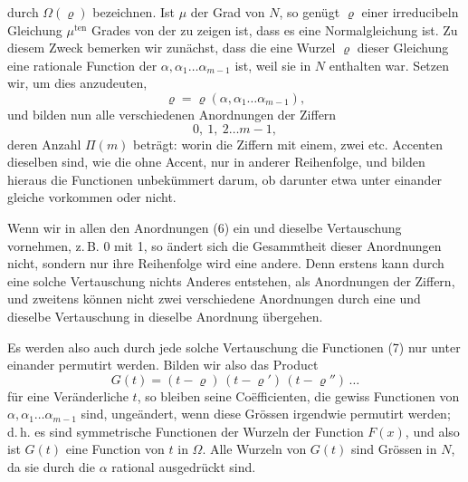 
durch $\Omega(\varrho)$ bezeichnen. Ist $\mu$ der Grad von $N$, so genügt $\varrho$ einer irreducibeln Gleichung $\mu^{\mathrm{ten}}$ Grades
von der zu zeigen ist, dass es eine Normalgleichung ist. Zu diesem Zweck bemerken wir zunächst, dass die eine Wurzel $\varrho$ dieser Gleichung eine rationale Function der $\alpha, \alpha_1 \ldots \alpha_{m-1}$ ist, weil sie in $N$ enthalten war. Setzen wir, um dies anzudeuten,
\[
\varrho = \varrho(\alpha, \alpha_1 \ldots \alpha_{m-1}),
\]
und bilden nun alle verschiedenen Anordnungen der Ziffern
\[
0,\ 1,\ 2 \ldots m - 1,
\]
deren Anzahl $\Pi(m)$ beträgt:
worin die Ziffern mit einem, zwei etc. Accenten dieselben sind, wie die ohne Accent, nur in anderer Reihenfolge, und bilden hieraus die Functionen
unbekümmert darum, ob darunter etwa unter einander gleiche vorkommen oder nicht.

Wenn wir in allen den Anordnungen (6) ein und dieselbe Vertauschung vornehmen, z.\,B. 0 mit 1, so ändert sich die Gesammtheit dieser Anordnungen nicht, sondern nur ihre Reihenfolge wird eine andere. Denn erstens kann durch eine solche Vertauschung nichts Anderes entstehen, als Anordnungen der Ziffern, und zweitens können nicht zwei verschiedene Anordnungen durch eine und dieselbe Vertauschung in dieselbe Anordnung übergehen.

Es werden also auch durch jede solche Vertauschung die Functionen (7) nur unter einander permutirt werden. Bilden wir also das Product
\[
G(t) = (t - \varrho)\,(t - \varrho')\,(t - \varrho'')\,\ldots
\]
für eine Veränderliche $t$, so bleiben seine Coëfficienten, die gewiss Functionen von $\alpha, \alpha_1 \ldots \alpha_{m-1}$ sind, ungeändert, wenn diese Grössen irgendwie permutirt werden; d.\,h. es sind symmetrische Functionen der Wurzeln der Function $F(x)$, und also ist $G(t)$ eine Function von $t$ in $\Omega$. Alle Wurzeln von $G(t)$ sind Grössen in $N$, da sie durch die $\alpha$ rational ausgedrückt sind.
